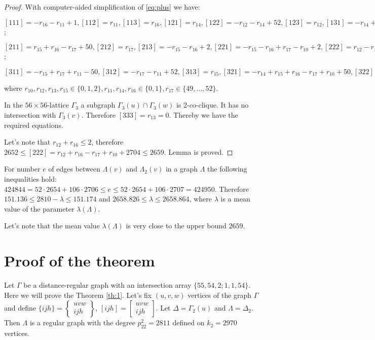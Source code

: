 \documentclass{article}
\theoremstyle{definition}
\theoremstyle{definition}
\theoremstyle{remark}
\begin{document}
\begin{proof} With computer-aided simplification of \ref{eq:plus} we have:

$[111] = -r_{16} - r_{11} + 1, [112] = r_{11} , [113] = r_{16} , [121] = r_{14} , [122] = -r_{12} - r_{14} + 52, [123] = r_{12} , [131] = -r_{14} + r_{16} + r_{11} , [132] = r_{12} + r_{14} - r_{11} , [133] = -r_{12} - r_{16} + 2$;

$[211] = r_{15} + r_{16} - r_{17} + 50, [212] = r_{17} , [213] = -r_{15} - r_{16} + 2, [221] = -r_{15} - r_{16} + r_{17} - r_{10} + 2, [222] = r_{12} -r_{13} +r_{16} -r_{17} +r_{10} +2704, [223] = -r_{12} +r_{13} +r_{15} +104, [231] = r_{10} , [232] = -r_{12} +r_{13} -r_{16} -r_{10} +106, [233] = r_{12} - r_{13} + r_{16}$;

$[311] = -r_{15} +r_{17} +r_{11} -50, [312] = -r_{17} -r_{11} +52, [313] = r_{15} , [321] = -r_{14} +r_{15} +r_{16} -r_{17} +r_{10} +50, [322] = r_{13} + r_{14} - r_{16} + r_{17} - r_{10} + 54, [323] = -r_{13} - r_{15} + 2, [331] = r_{14} - r_{16} - r_{10} - r_{11} + 2, [332] = -r_{13} - r_{14} + r_{16} + r_{10} + r_{11} , [333] = r_{13}$

where $r_{10} , r_{12} , r_{13} , r_{15} \in \{0, 1, 2\}, r_{11} , r_{14} , r_{16} \in \{0, 1\}, r_{17} \in \{49, ..., 52\}$.

In the $56 \times 56$-lattice $\Gamma_3$ a subgraph $\Gamma_3(u) \cap \Gamma_3(w)$ is 2-co-clique. It has no intersection with $\Gamma_3(v)$. Therefore $[333] = r_{13} = 0$. Thereby we have the required equations.

Let's note that $r_{12} + r_{16} \le 2$, therefore $2652 \le [222] = r_{12} + r_{16} - r_{17} + r_{10} + 2704 \le 2659$. Lemma is proved.
\end{proof}
For number $e$ of edges between $\Lambda(v)$ and $\Lambda_2(v)$ in a graph $\Lambda$ the following inequalities hold: $424844 = 52 \cdot 2654 + 106 \cdot 2706 \le e \le 52 \cdot 2654 + 106 \cdot 2707 = 424950$. Therefore $ 151.136 \le 2810 - \lambda \le 151.174$ and $2658.826 \le \lambda \le 2658.864$, where $\lambda$ is a mean value of the parameter $\lambda(\Lambda)$.

Let's note that the mean value $\lambda(\Lambda)$ is very close to the upper bound $2659$.

\section{Proof of the theorem}

Let $\Gamma$ be a distance-regular graph with an intersection array $\{55, 54, 2; 1, 1, 54\}$. Here we will prove the Theorem \ref{th:1}.
Let's fix $(u,v,w)$ vertices of the graph $\Gamma$ and define
$\{ijh\} = \begin{Bmatrix}uvw \\ ijh \end{Bmatrix}$,
$[ijh] = \begin{bmatrix}uvw \\ ijh \end{bmatrix}$.
Let $\Delta = \Gamma_2(u)$ and $\Lambda = \Delta_2$. Then $\Lambda$ is a regular graph with the degree $p^2_{22} = 2811$ defined on $k_2 = 2970$ vertices.
\end{document}
